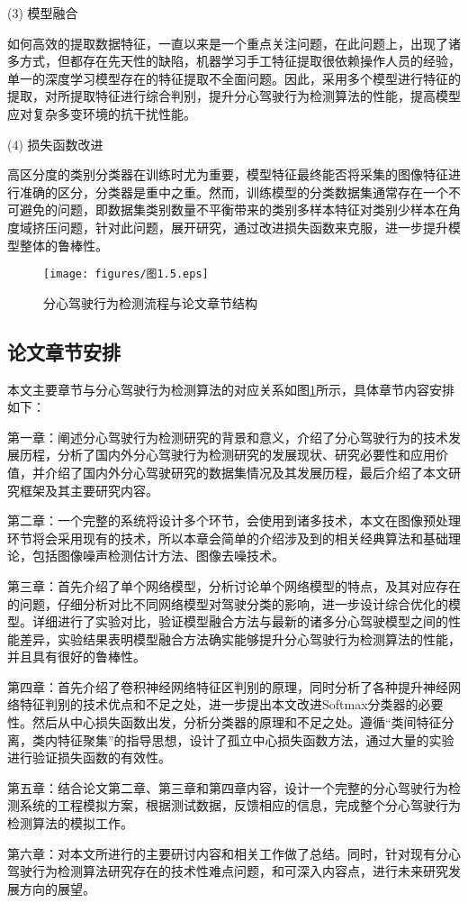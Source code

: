 (3)	模型融合

如何高效的提取数据特征，一直以来是一个重点关注问题，在此问题上，出现了诸多方式，但都存在先天性的缺陷，机器学习手工特征提取很依赖操作人员的经验，单一的深度学习模型存在的特征提取不全面问题。因此，采用多个模型进行特征的提取，对所提取特征进行综合判别，提升分心驾驶行为检测算法的性能，提高模型应对复杂多变环境的抗干扰性能。

(4)	损失函数改进

高区分度的类别分类器在训练时尤为重要，模型特征最终能否将采集的图像特征进行准确的区分，分类器是重中之重。然而，训练模型的分类数据集通常存在一个不可避免的问题，即数据集类别数量不平衡带来的类别多样本特征对类别少样本在角度域挤压问题，针对此问题，展开研究，通过改进损失函数来克服，进一步提升模型整体的鲁棒性。

\begin{figure}[!h]
	\centering
	\texttt{[image: figures/图1.5.eps]}\\
	\caption{分心驾驶行为检测流程与论文章节结构}\label{图1.5}
\end{figure}

\subsection{论文章节安排}

本文主要章节与分心驾驶行为检测算法的对应关系如图\ref{图1.5}所示，具体章节内容安排如下：

第一章：阐述分心驾驶行为检测研究的背景和意义，介绍了分心驾驶行为的技术发展历程，分析了国内外分心驾驶行为检测研究的发展现状、研究必要性和应用价值，并介绍了国内外分心驾驶研究的数据集情况及其发展历程，最后介绍了本文研究框架及其主要研究内容。

第二章：一个完整的系统将设计多个环节，会使用到诸多技术，本文在图像预处理环节将会采用现有的技术，所以本章会简单的介绍涉及到的相关经典算法和基础理论，包括图像噪声检测估计方法、图像去噪技术。

第三章：首先介绍了单个网络模型，分析讨论单个网络模型的特点，及其对应存在的问题，仔细分析对比不同网络模型对驾驶分类的影响，进一步设计综合优化的模型。详细进行了实验对比，验证模型融合方法与最新的诸多分心驾驶模型之间的性能差异，实验结果表明模型融合方法确实能够提升分心驾驶行为检测算法的性能，并且具有很好的鲁棒性。

第四章：首先介绍了卷积神经网络特征区判别的原理，同时分析了各种提升神经网络特征判别的技术优点和不足之处，进一步提出本文改进Softmax分类器的必要性。然后从中心损失函数出发，分析分类器的原理和不足之处。遵循“类间特征分离，类内特征聚集”的指导思想，设计了孤立中心损失函数方法，通过大量的实验进行验证损失函数的有效性。

第五章：结合论文第二章、第三章和第四章内容，设计一个完整的分心驾驶行为检测系统的工程模拟方案，根据测试数据，反馈相应的信息，完成整个分心驾驶行为检测算法的模拟工作。

第六章：对本文所进行的主要研讨内容和相关工作做了总结。同时，针对现有分心驾驶行为检测算法研究存在的技术性难点问题，和可深入内容点，进行未来研究发展方向的展望。






